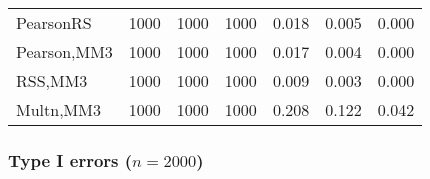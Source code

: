 \documentclass[
]{article}
\begin{document}
\begin{table}[H]
{\begin{tabular}[t]{lrrrrrr}
\hspace{1em}PearsonRS & 1000 & 1000 & 1000 & 0.018 & 0.005 & 0.000\\
\hspace{1em}Pearson,MM3 & 1000 & 1000 & 1000 & 0.017 & 0.004 & 0.000\\
\hspace{1em}RSS,MM3 & 1000 & 1000 & 1000 & 0.009 & 0.003 & 0.000\\
\hspace{1em}Multn,MM3 & 1000 & 1000 & 1000 & 0.208 & 0.122 & 0.042\\
\bottomrule
\end{tabular}}
\end{table}

\hypertarget{type-i-errors-n2000-3}{%
\subsubsection{\texorpdfstring{Type I errors
(\(n=2000\))}{Type I errors (n=2000)}}\label{type-i-errors-n2000-3}}
\end{document}

